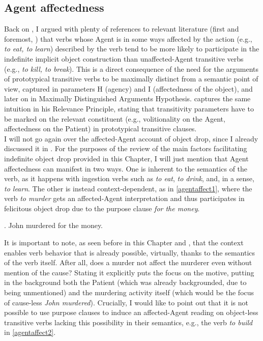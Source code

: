 \subsection{Agent affectedness} 

Back on , I argued with plenty of references to relevant literature (first and foremost, \textcite{Naess2007}) that verbs whose Agent is in some ways affected by the action (e.g., \textit{to eat, to learn}) described by the verb tend to be more likely to participate in the indefinite implicit object construction than unaffected-Agent transitive verbs (e.g., \textit{to kill, to break}). This is a direct consequence of the need for the arguments of prototypical transitive verbs to be maximally distinct from a semantic point of view, captured in  parameters H (agency) and I (affectedness of the object), and later on in  Maximally Distinguished Arguments Hypothesis. \textcite[335]{malchukov2006transitivity} captures the same intuition in his Relevance Principle, stating that  transitivity parameters have to be marked on the relevant constituent (e.g., volitionality on the Agent, affectedness on the Patient) in prototypical transitive clauses.\\
I will not go again over the affected-Agent account of object drop, since I already discussed it in . For the purposes of the review of the main factors facilitating indefinite object drop provided in this Chapter, I will just mention that Agent affectedness can manifest in two ways. One is inherent to the semantics of the verb, as it happens with ingestion verbs such as \textit{to eat}, \textit{to drink}, and, in a sense, \textit{to learn}. The other is instead context-dependent, as in \ref{agentaffect1}, where the verb \textit{to murder} gets an affected-Agent interpretation and thus participates in felicitous object drop due to the purpose clause \textit{for the money}.

\ex. \label{agentaffect1} John murdered for the money. \hfill \parencite[136]{Naess2007}

It is important to note, as seen before in this Chapter and , that the context enables verb behavior that is already possible, virtually, thanks to the semantics of the verb itself. After all, does a murder not affect the murderer even without mention of the cause? Stating it explicitly puts the focus on the motive, putting in the background both the Patient (which was already backgrounded, due to being unmentioned) and the murdering activity itself (which would be the focus of cause-less \textit{John murdered}). Crucially, I would like to point out that it is not possible to use purpose clauses to induce an affected-Agent reading on object-less transitive verbs lacking this possibility in their semantics, e.g., the verb \textit{to build} in \ref{agentaffect2}.


